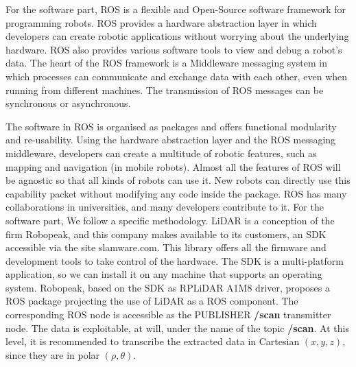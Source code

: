 \documentclass[Afour,sageh,times]{sagej}
\begin{document}
For the software part, ROS is a flexible and Open-Source software framework for programming robots. ROS provides a hardware abstraction layer in which developers can create robotic applications without worrying about the underlying hardware. ROS also provides various software tools to view and debug a robot's data. The heart of the ROS framework is a Middleware messaging system in which processes can communicate and exchange data with each other, even when running from different machines. The transmission of ROS messages can be synchronous or asynchronous.

The software in ROS is organised as packages and offers functional modularity and re-usability. Using the hardware abstraction layer and the ROS messaging middleware, developers can create a multitude of robotic features, such as mapping and navigation (in mobile robots). Almost all the features of ROS will be agnostic so that all kinds of robots can use it. New robots can directly use this capability packet without modifying any code inside the package.
ROS has many collaborations in universities, and many developers contribute to it.
For the software part, We follow a specific methodology. LiDAR is a conception of the firm Robopeak, and this company makes available to its customers, an SDK accessible via the site slamware.com. This library offers all the firmware and development tools to take control of the hardware. The SDK is a multi-platform application, so we can install it on any machine that supports an operating system.
Robopeak, based on the SDK as RPLiDAR A1M8 driver, proposes a ROS package projecting the use of LiDAR as a ROS component. The corresponding ROS node is accessible as the PUBLISHER \textbf{/scan} transmitter node. The data is exploitable, at will, under the name of the topic \textbf{/scan}. At this level, it is recommended to transcribe the extracted data in Cartesian $(x,y,z)$, since they are in polar $(\rho,\theta)$.
\end{document}
